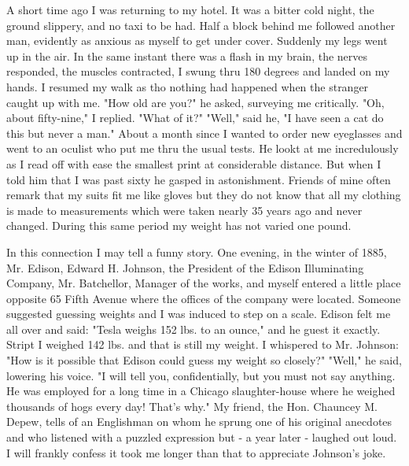 \documentclass[a4paper,12pt,english,twoside,openright]{memoir}
\begin{document}
	A short time ago I was returning to my hotel.  It was a bitter cold night, the ground slippery, and 
	no taxi to be had.  Half a block behind me followed another man, evidently as anxious as myself 
	to get under cover.  Suddenly my legs went up in the air.  In the same instant there was a flash in 
	my brain, the nerves responded, the muscles contracted, I swung thru 180 degrees and landed 
	on my hands.  I resumed my walk as tho nothing had happened when the stranger caught up with 
	me.  "How old are you?" he asked, surveying me critically.  "Oh, about fifty-nine," I replied.  "What 
	of it?" "Well," said he, "I have seen a cat do this but never a man."  About a month since I wanted 
	to order new eyeglasses and went to an oculist who put me thru the usual tests.  He lookt at me 
	incredulously as I read off with ease the smallest print at considerable distance.  But when I told 
	him that I was past sixty he gasped in astonishment.  Friends of mine often remark that my suits 
	fit me like gloves but they do not know that all my clothing is made to measurements which were 
	taken nearly 35 years ago and never changed.  During this same period my weight has not varied 
	one pound.  
	
	In this connection I may tell a funny story.  One evening, in the winter of 1885, Mr. Edison, 
	Edward H. Johnson, the President of the Edison Illuminating Company, Mr. Batchellor, Manager 
	of the works, and myself entered a little place opposite 65 Fifth Avenue where the offices of the 
	company were located.  Someone suggested guessing weights and I was induced to step on a 
	scale.  Edison felt me all over and said: "Tesla weighs 152 lbs.  to an ounce," and he guest it 
	exactly.  Stript I weighed 142 lbs.  and that is still my weight.  I whispered to Mr. Johnson: "How is 
	it possible that Edison could guess my weight so closely?" "Well," he said, lowering his voice.  "I 
	will tell you, confidentially, but you must not say anything.  He was employed for a long time in a 
	Chicago slaughter-house where he weighed thousands of hogs every day! That's why." My friend, 
	the Hon. Chauncey M. Depew, tells of an Englishman on whom he sprung one of his original 
	anecdotes and who listened with a puzzled expression but - a year later - laughed out loud.  I will 
	frankly confess it took me longer than that to appreciate Johnson's joke.  
	
\end{document}
